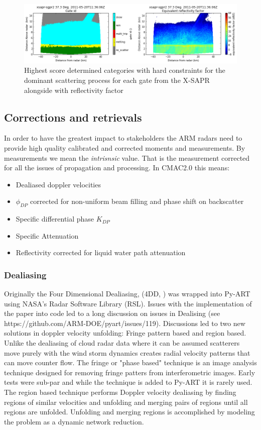 \documentclass[twocol]{ametsoc}
\begin{document}
\begin{figure}[h]
    \centering
    \includegraphics[width=0.95\columnwidth]{xsaprfuz.png}
    \caption{Highest score determined categories with hard constraints for the dominant scattering process for each gate from the X-SAPR alongside with reflectivity factor }
    \label{fig:xfuz}
\end{figure}


\subsection{Corrections and retrievals}
In order to have the greatest impact to stakeholders the ARM radars need to provide high quality calibrated and corrected moments and measurements. By measurements we mean the {\it intrisnsic} value. 
That is the measurement corrected for all the issues of propagation and processing. In CMAC2.0 this means:
\begin{itemize}  
\item Dealiased doppler velocities 
\item $\phi_{DP}$ corrected for non-uniform beam filling and phase shift on backscatter
\item Specific differential phase $K_{DP}$
\item Specific Attenuation 
\item Reflectivity corrected for liquid water path attenuation
\end{itemize}
\subsubsection{Dealiasing}
Originally the Four Dimensional Dealiasing, (4DD, \cite{james_real-time_2001} ) was wrapped into Py-ART using NASA's Radar Software Library (RSL). Issues with the implementation of the paper into  
code led to a long discussion on issues in Dealising (see https://github.com/ARM-DOE/pyart/issues/119). Discussions led to two new solutions in doppler velocity unfolding: Fringe pattern based and region based. Unlike 
the dealiasing of cloud radar data where it can be assumed scatterers move purely with the wind storm dynamics creates radial velocity patterns that can move counter flow. The fringe or "phase based" technique is an image analysis technique designed for removing fringe patters from interferometric images. Early tests were sub-par and while the technique is added to Py-ART it is rarely used. The region based technique performs Doppler velocity dealiasing by finding regions of similar velocities and unfolding and merging pairs of regions until all regions are unfolded. Unfolding and merging regions is accomplished by modeling the problem as a dynamic network reduction. 
\end{document}
